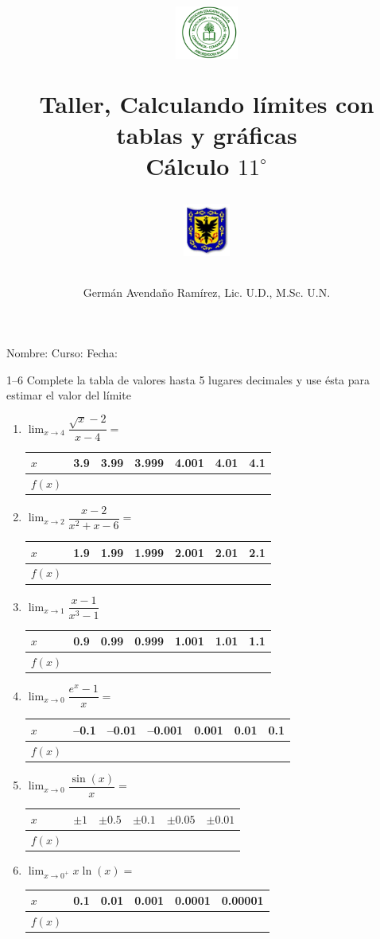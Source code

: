 \documentclass[10pt,twoside]{article}
\author{Germ\'an Avenda\~no Ram\'irez, Lic. U.D., M.Sc. U.N.}
\title{\begin{minipage}{.2\textwidth}
\includegraphics[height=1.75cm]{Images/logo-colegio.png}\end{minipage}
\begin{minipage}{.55\textwidth}
\begin{center}
Taller, Calculando límites con tablas y gráficas \\
Cálculo $11^{\circ}$
\end{center}
\end{minipage}\hfill
\begin{minipage}{.2\textwidth}
\includegraphics[height=1.75cm]{Images/logo-sed.png} 
\end{minipage}}
\date{}
\begin{document}
\maketitle
Nombre: \hrulefill Curso: \underline{\hspace*{44pt}} Fecha: \underline{\hspace*{2.5cm}}

1--6 Complete la tabla de valores hasta 5 lugares decimales y use ésta para estimar el valor del límite
\begin{enumerate}
 \item $\displaystyle{\lim_{x\rightarrow4}\dfrac{\sqrt{x}-2}{x-4}}=$ \hfill
\begin{tabular}{|l|l|l|l||l|l|l|}\hline
$x$ & 3.9 & 3.99 & 3.999 & 4.001 & 4.01 & 4.1\\\hline
$f(x)$ &  &  &  &  &  & \\\hline
                                                           \end{tabular}                                                                                                                      
\item $\displaystyle{\lim_{x\rightarrow2}\dfrac{x-2}{x^{2}+x-6}}=$\hfill
\begin{tabular}{|l|l|l|l||l|l|l|}\hline
$x$ & 1.9 & 1.99 & 1.999 & 2.001 & 2.01 & 2.1\\\hline
$f(x)$ &  &  &  &  &  & \\\hline
\end{tabular}
\item $\displaystyle{\lim_{x\rightarrow1}\dfrac{x-1}{x^{3}-1}}$ \hfill
\begin{tabular}{|l|l|l|l||l|l|l|}\hline
$x$ & 0.9 & 0.99 & 0.999 & 1.001 & 1.01 & 1.1\\\hline
$f(x)$ &  &  &  &  &  & \\\hline
\end{tabular}
\item $\displaystyle{\lim_{x\rightarrow0}\dfrac{e^{x}-1}{x}}=$ \hfill
\begin{tabular}{|l|l|l|l||l|l|l|}\hline
$x$ & --0.1 & --0.01 & --0.001 & 0.001 & 0.01 & 0.1\\\hline
$f(x)$ &  &  &  &  &  & \\\hline
\end{tabular}
\item $\displaystyle{\lim_{x\rightarrow0}\dfrac{\sin(x)}{x}}=$\hfill
\begin{tabular}{|l|l|l|l|l|l|}\hline
$x$ & $\pm1$ & $\pm0.5$ & $\pm0.1$ & $\pm0.05$ & $\pm0.01$ \\\hline
$f(x)$ &  &  &  &  & \\\hline
\end{tabular}
\item $\displaystyle{\lim_{x\rightarrow 0^{+}}x\ln(x)}=$ \hfill
\begin{tabular}{|l|l|l|l|l|l|}\hline
$x$ & 0.1 & 0.01 & 0.001 & 0.0001 & 0.00001\\\hline
$f(x)$ &  &  &  &  & \\\hline
\end{tabular}


\end{enumerate}
\end{document}

